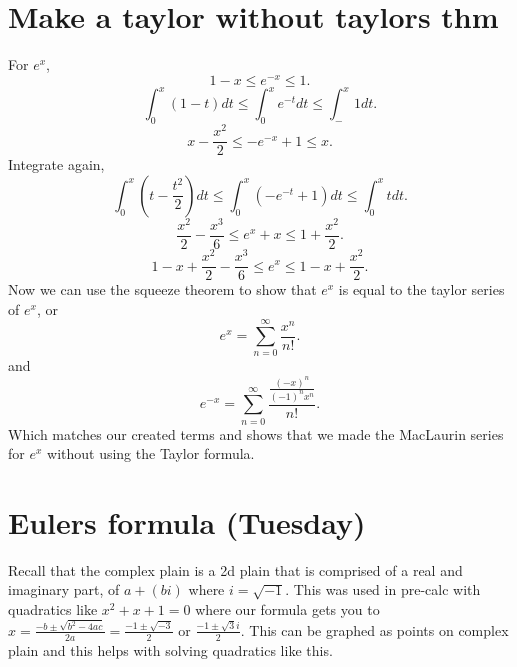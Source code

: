 \section{Make a taylor without taylors thm }%
\label{sec:Make a taylor without taylors thm}
For $ e^{ x } $,
\[
1-x\le e^{ -x } \le 1
.\] 
\[
\int_{ 0 }^{ x } \left( 1-t \right) dt \le \int_{ 0 }^{ x } e^{ -t }dt \le \int_{ - }^{ x } 1dt
.\] 
\[
x-\frac{ x^2 }{ 2 } \le -e^{ -x }+1 \le x
.\] 
Integrate again,
\[
\int_{ 0 }^{ x } \left( t-\frac{ t^2 }{ 2 }  \right) dt\le \int_{ 0 }^{ x } \left( -e^{ -t }+1 \right) dt \le \int_{ 0 }^{ x } tdt
.\] 
\[
\frac{ x^2 }{ 2 } -\frac{ x^3 }{ 6 } \le e^{ x }+x \le 1 + \frac{ x^2 }{ 2 } 
.\] 
\[
1-x + \frac{ x^2 }{ 2 } -\frac{ x^3 }{ 6 } \le e^{ x } \le 1 -x +\frac{ x^2 }{ 2 } 
.\] 
Now we can use the squeeze theorem to show that $ e^{ x } $ is equal to the taylor series of $ e^{ x } $, or 
\[
e^{ x }= \sum_{ n=0 } ^{ \infty } \frac{ x^{ n } }{ n! }
.\] 
and
\[
e^{ -x }=\sum_{ n=0 } ^{ \infty } \frac{ \frac{ \left( -x \right) ^{ n } }{ \left( -1 \right) ^{ n }x^{ n } } }{ n! } 
.\] 
Which matches our created terms and shows that we made the MacLaurin series for $ e^{ x } $ without using the Taylor formula.
\section{Eulers formula (Tuesday)}%
\label{sec:Eulers formula}
Recall that the complex plain is a 2d plain that is comprised of a real and imaginary part, of $ a+\left( bi \right)  $ where $ i=\sqrt{ -1 }  $. This was used in pre-calc with quadratics like $ x^2+x+1=0 $ where our formula gets you to $ x = \frac{ -b\pm\sqrt{ b^2-4ac }  }{ 2a } = \frac{ -1\pm\sqrt{ -3 }  }{ 2 }\text{ or }\frac{ -1\pm\sqrt{ 3 } i }{ 2 } $. This can be graphed as points on complex plain and this helps with solving quadratics like this. \\

